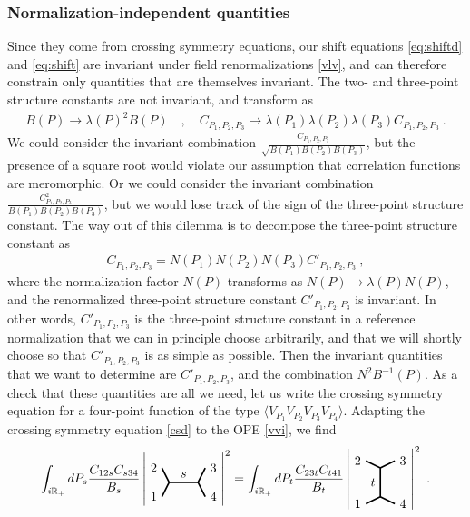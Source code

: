 \documentclass[12pt, a4paper, notitlepage, twoside]{report}
\numberwithin{equation}{section}
\theoremstyle{break}
\begin{document}
\subsubsection{Normalization-independent quantities} 

Since they come from crossing symmetry equations, our  shift equations  \eqref{eq:shiftd} and \eqref{eq:shift} are invariant under field renormalizations \eqref{vlv}, and can therefore constrain only quantities that are themselves invariant. The two- and three-point structure constants are not invariant, and transform as 
\begin{align}
 B(P) \to \lambda(P)^2 B(P) \quad , \quad C_{P_1,P_2,P_3} \to \lambda(P_1)\lambda(P_2)\lambda(P_3) C_{P_1,P_2,P_3}\ .
\end{align}
We could consider the invariant combination $\frac{C_{P_1,P_2,P_3}}{\sqrt{B(P_1)B(P_2)B(P_3)}}$, but the presence of a square root would violate our assumption that correlation functions are meromorphic. Or we could consider the invariant combination $\frac{C_{P_1,P_2,P_3}^2}{B(P_1)B(P_2)B(P_3)}$, but we would lose track of the sign of the three-point structure constant. The way out of this dilemma is to decompose the three-point structure constant as 
\begin{align}
 C_{P_1,P_2,P_3} = N(P_1)N(P_2)N(P_3)C'_{P_1,P_2,P_3}\ ,
\end{align}
where the normalization factor $N(P)$ transforms as $N(P)\to \lambda(P)N(P)$, and the renormalized three-point structure constant $C'_{P_1,P_2,P_3}$ is invariant. In other words, $C'_{P_1,P_2,P_3}$ is the three-point structure constant in a reference normalization that we can in principle choose arbitrarily, and that we will shortly choose so that $C'_{P_1,P_2,P_3}$ is as simple as possible.
Then the invariant quantities that we want to determine are $C'_{P_1,P_2,P_3}$, and the combination $N^2B^{-1}(P)$. As a check that these quantities are all we need, let us write the crossing symmetry equation for a four-point function of the type $\langle V_{P_1}V_{P_2}V_{P_3}V_{P_4}\rangle$. Adapting the crossing symmetry equation \eqref{csd} to the 
OPE \eqref{vvi}, we find 
\begin{align}
 \int_{i\mathbb{R}_+} dP_s\frac{C_{12s} C_{s34}}{B_s} \left| 
 \begin{tikzpicture}[baseline=(current  bounding  box.center), very thick, scale = .2]
\draw (-1,2) node [left] {$2$} -- (0,0) -- node [above] {$s$} (4,0) -- (5,2) node [right] {$3$};
\draw (-1,-2) node [left] {$1$} -- (0,0);
\draw (4,0) -- (5,-2) node [right] {$4$};
\end{tikzpicture} 
\right|^2 = \int_{i\mathbb{R}_+} dP_t \frac{C_{23t}C_{t41}}{B_t} \left|
\begin{tikzpicture}[baseline=(current  bounding  box.center), very thick, scale = .2]
 \draw (-2,3) node [left] {$2$} -- (0,2) -- node [left] {$t$} (0,-2) -- (-2, -3) node [left] {$1$};
\draw (0,2) -- (2,3) node [right] {$3$};
\draw (0,-2) -- (2, -3) node [right] {$4$};
\end{tikzpicture}
\right|^2\ .
\label{gce}
\end{align}
\end{document}
